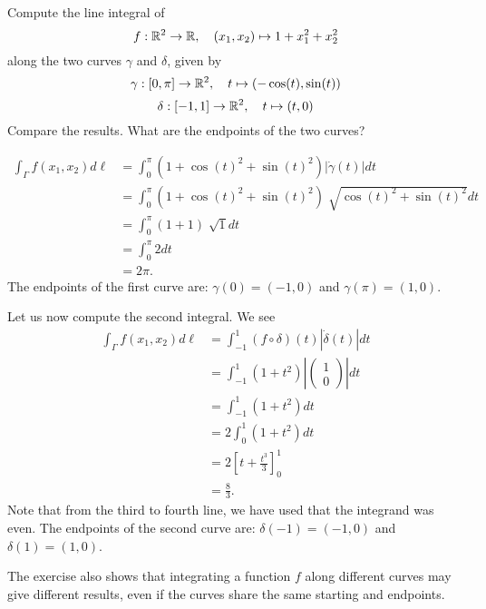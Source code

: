 \documentclass[11pt]{article}
\begin{document}
\begin{exercise}
    Compute the line integral of
    \[
        f : \mathbb{R}^2 \to \mathbb{R}, \quad (x_1,x_2) \mapsto 1 + x_1^2 + x_2^2
    \]
    along the two curves $\gamma$ and $\delta$, given by 
    \[
        \gamma : [0,\pi] \rightarrow \mathbb{R}^2, \quad t \mapsto ( -\cos(t), \sin(t) )
    \]
    \[
        \delta : [-1,1] \rightarrow \mathbb{R}^2, \quad t \mapsto (t,0)
    \]
    Compare the results. What are the endpoints of the two curves? 
\end{exercise}
\begin{solution}     
    \begin{align*}
        \int_{\Gamma} f(x_1,x_2) d\ell 
        &= \int_{0}^{\pi} ( 1 + \cos(t)^2 + \sin(t)^2 ) |\dot{\gamma}(t)|dt
        \\&= \int_{0}^{\pi} ( 1 + \cos(t)^2 + \sin(t)^2 ) \sqrt[]{\cos(t)^2 + \sin(t)^2} dt
        \\&= \int_{0}^{\pi} ( 1 + 1 ) \sqrt[]{1} dt
        \\&= \int_{0}^{\pi} 2 dt
        \\&= 2\pi.
    \end{align*}
    The endpoints of the first curve are: $\gamma(0) = (-1,0)$ and $\gamma(\pi) = (1,0)$.

    Let us now compute the second integral. We see 
    \begin{align*}
        \int_{\Gamma} f(x_1,x_2) d\ell 
        &= \int_{-1}^{1} (f\circ \delta)(t)|\dot{\delta}(t)|dt
        \\&= \int_{-1}^1 (1+t^2)\left|\begin{pmatrix} 1\\0 \end{pmatrix}\right| dt
        \\&= \int_{-1}^1 (1+t^2) dt
        \\&= 2 \int_{0}^1 (1+t^2) dt
        \\&= 2\left[t+\frac{t^3}{3} \right]_{0}^{1}
        \\&= \frac 8 3.
    \end{align*}
    Note that from the third to fourth line, we have used that the integrand was even. 
    The endpoints of the second curve are: $\delta(-1) = (-1,0)$ and $\delta(1) = (1,0)$.

    The exercise also shows that integrating a function $f$ along different curves may give different results, 
    even if the curves share the same starting and endpoints. 
\end{solution}
\end{document}
